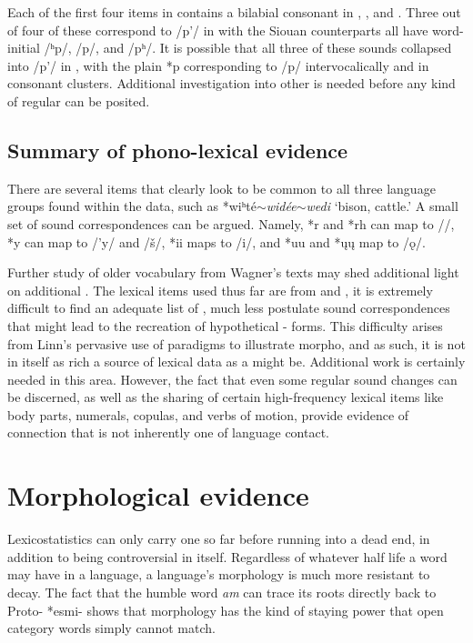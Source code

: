 \documentclass[output=paper]{LSP/langsci}
\begin{document}
Each of the first four items in  contains a bilabial consonant in , , and . Three out of four of these correspond to /p'/ in  with the Siouan counterparts all have word-initial /ʰp/, /p/, and /pʰ/. It is possible that all three of these sounds collapsed into /p'/ in , with the plain *p corresponding to  /p/ intervocalically and in consonant clusters. Additional investigation into other  is needed before any kind of regular  can be posited.

\subsection{Summary of phono-lexical evidence}

There are several items that clearly look to be common to all three language groups found within the data, such as *wiʰt\'e$\sim$\emph{wid\'ee}$\sim$\emph{wedi} `bison, cattle.' A small set of sound correspondences can be argued. Namely, *r and *rh can map to /\textbeltl/, *y can map to /'y/ and /\v{s}/, *ii maps to /i/, and *uu and *\k{u}\k{u} map to /\k{o}/. 

Further study of older vocabulary from Wagner's \citeyear{Wagner1931} texts may shed additional light on additional . The lexical items used thus far are from \citet{Linn2000} and \citet{Rankinetal2015AccessSeptember}, it is extremely difficult to find an adequate list of , much less postulate sound correspondences that might lead to the recreation of hypothetical - forms. This difficulty arises from Linn's pervasive use of paradigms to illustrate  morpho, and as such, it is not in itself as rich a source of lexical data as a  might be. Additional work is certainly needed in this area. However, the fact that even some regular sound changes can be discerned, as well as the sharing of certain high-frequency lexical items like body parts, numerals, copulas, and verbs of motion, provide evidence of connection that is not inherently one of language contact.

\section{Morphological evidence}\label{sec:kasak:5}

Lexicostatistics can only carry one so far before running into a dead end, in addition to being controversial in itself. Regardless of whatever half life a word may have in a language, a language's morphology is much more resistant to decay. The fact that the humble  word \textit{am} can trace its roots directly back to Proto- *esmi- shows that morphology has the kind of staying power that open category words simply cannot match.
\end{document}
